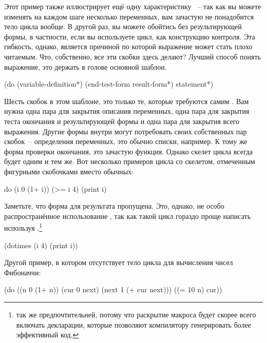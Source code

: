 Этот пример также иллюстрирует ещё одну характеристику ~-- так как вы можете
изменять на каждом шаге несколько переменных, вам зачастую не понадобится тело цикла
вообще. В другой раз, вы можете обойтись без результирующей формы, в частности, если вы
используете цикл, как конструкцию контроля. Эта гибкость, однако, является причиной по
которой выражение  может стать плохо читаемым. Что, собственно, все эти скобки
здесь делают? Лучший способ понять  выражение, это держать в голове основной
шаблон.

\begin{myverb}
(do (variable-definition*)
    (end-test-form result-form*)
  statement*)
\end{myverb}

Шесть скобок в этом шаблоне, это только те, которые требуются самим . Вам нужна
одна пара для закрытия описания переменных, одна пара для закрытия теста окончания и
результирующей формы и одна пара для закрытия всего выражения. Другие формы внутри
 могут потребовать своих собственных пар скобок~-- определения переменных, это
обычно списки, например. К тому же форма проверки окончания, это зачастую функция. Однако
скелет  цикла всегда будет одним и тем же. Вот несколько примеров цикла 
со скелетом, отмеченным фигурными скобочками вместо обычных:

\begin{myverb}
{do {(i 0 (1+ i))}
    {(>= i 4)}
  (print i)}
\end{myverb}

Заметьте, что форма для результата пропущена. Это, однако, не особо распространённое
использование , так как такой цикл гораздо проще написать используя
.\footnote{ так же предпочтительней, потому что раскрытие
  макроса будет скорее всего включать декларации, которые позволяют компилятору
  генерировать более эффективный код.}

\begin{myverb}
(dotimes (i 4) (print i))
\end{myverb}

Другой пример, в котором отсутствует тело цикла для вычисления чисел Фибоначчи:

\begin{myverb}
(do ((n 0 (1+ n))
     (cur 0 next)
     (next 1 (+ cur next)))
    ((= 10 n) cur))
\end{myverb}

